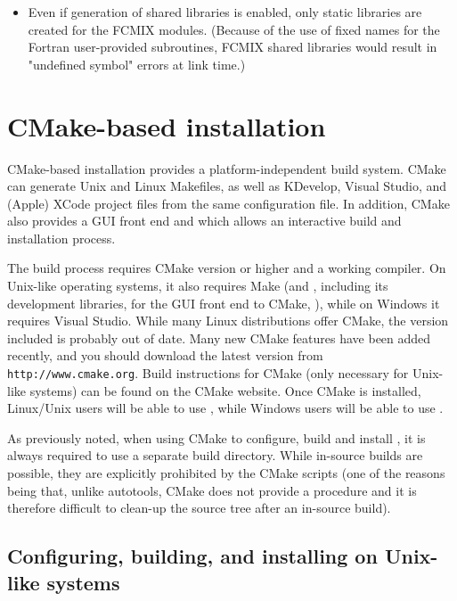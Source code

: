 \begin{itemize}
\item Even if generation of shared libraries is enabled, only static libraries
  are created for the FCMIX modules.  (Because of the use of fixed names for
  the Fortran user-provided subroutines, FCMIX shared libraries would result in
  "undefined symbol" errors at link time.)

\end{itemize}


\section{CMake-based installation}\label{s:cmake_inst}

CMake-based installation provides a platform-independent build system. CMake can generate
Unix and Linux Makefiles, as well as KDevelop, Visual Studio, and 
(Apple) XCode project files from the same configuration file.
In addition, CMake also provides a GUI front end and which allows an interactive build and
installation process.

The {\sundials} build process requires CMake version  or
higher and a working compiler.  On Unix-like operating systems, it
also requires Make (and , including its development libraries,
for the GUI front end to CMake, ), while on Windows it
requires Visual Studio.  While many Linux distributions offer CMake,
the version included is probably out of date.  Many new CMake
features have been added recently, and you should download the latest
version from {\tt http://www.cmake.org}.  Build instructions for CMake
(only necessary for Unix-like systems) can be found on the CMake website.
Once CMake is installed, Linux/Unix users will be able to use ,
while Windows users will be able to use .

As previously noted, when using CMake to configure, build and install {\sundials}, it is always
required to use a separate build directory. While in-source builds are possible, they are
explicitly prohibited by the {\sundials} CMake scripts (one of the reasons being that, unlike
autotools, CMake does not provide a  procedure and it is therefore
difficult to clean-up the source tree after an in-source build).

\subsection{Configuring, building, and installing on Unix-like systems}

